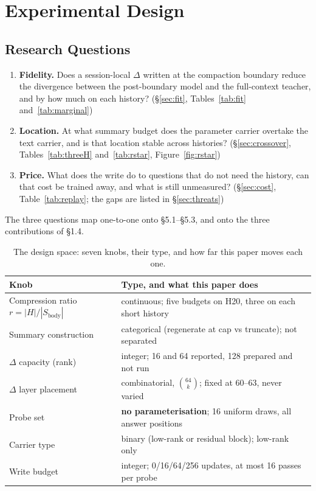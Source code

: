 \documentclass[sigconf,nonacm]{acmart}
\begin{document}
\section{Experimental Design}\label{sec:protocol}

\subsection{Research Questions}

\begin{enumerate}[leftmargin=2.6em,label=\textbf{RQ\arabic*}]
\item \textbf{Fidelity.} Does a session-local $\Delta$ written at the compaction boundary reduce the divergence
between the post-boundary model and the full-context teacher, and by how much on each history? (\S\ref{sec:fit},
Tables~\ref{tab:fit} and~\ref{tab:marginal})
\item \textbf{Location.} At what summary budget does the parameter carrier overtake the text carrier, and is
that location stable across histories? (\S\ref{sec:crossover}, Tables~\ref{tab:threeH} and~\ref{tab:rstar},
Figure~\ref{fig:rstar})
\item \textbf{Price.} What does the write do to questions that do not need the history, can that cost be trained
away, and what is still unmeasured? (\S\ref{sec:cost}, Table~\ref{tab:replay}; the gaps are listed in
\S\ref{sec:threats})
\end{enumerate}

The three questions map one-to-one onto \S5.1--\S5.3, and onto the three contributions of \S1.4.

\begin{table}[t]
\centering
\small
\begin{tabular}{@{}l>{\raggedright\arraybackslash}p{3.9cm}@{}}
\toprule
Knob & Type, and what this paper does \\
\midrule
Compression ratio $r=|H|/|S_{\text{body}}|$ & continuous; five budgets on H20, three on each short history \\
Summary construction & categorical (regenerate at cap vs truncate); not separated \\
$\Delta$ capacity (rank) & integer; 16 and 64 reported, 128 prepared and not run \\
$\Delta$ layer placement & combinatorial, $\binom{64}{k}$; fixed at 60--63, never varied \\
Probe set & \textbf{no parameterisation}; 16 uniform draws, all answer positions \\
Carrier type & binary (low-rank or residual block); low-rank only \\
Write budget & integer; 0/16/64/256 updates, at most 16 passes per probe \\
\bottomrule
\end{tabular}
\caption{The design space: seven knobs, their type, and how far this paper moves each one.}
\label{tab:knobs}
\end{table}
\end{document}
